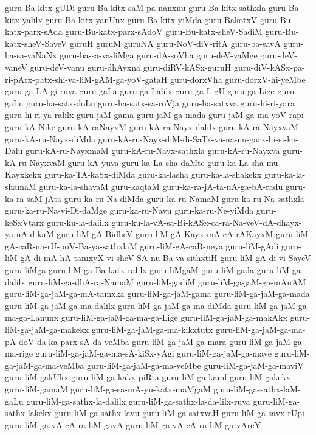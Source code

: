 {guru-Ba-kitx-gUDi
guru-Ba-kitx-saM-pa-nanxnu
guru-Ba-kitx-sathxla
guru-Ba-kitx-yalilx
guru-Ba-kitx-yanUnx
guru-Ba-kitx-yiMda
guru-BakotxV
guru-Bu-katx-parx-sAda
guru-Bu-katx-parx-sAdoV
guru-Bu-katx-sheV-SadiM
guru-Bu-katx-sheV-SaveV
guruH
guruM
guruNA
guru-NoV-diV-ritA
guru-ba-savA
guru-ba-sa-vaNaNx
guru-ba-sa-va-liMga
guru-dA-soVha
guru-deV-vaMge
guru-deV-vaneV
guru-deV-vanu
guru-dhAyxna
guru-diRV-kASx-guruH
guru-diV-kASx-pa-ri-pArx-patx-shi-va-liM-gAM-ga-yoV-gataH
guru-dorxVha
guru-dorxV-hi-yeMbe
guru-ga-LA-gi-ruva
guru-gaLa
guru-ga-Lalilx
guru-ga-LigU
guru-ga-Lige
guru-gaLu
guru-ha-satx-doLu
guru-ha-satx-sa-roVja
guru-ha-satxva
guru-hi-ri-yara
guru-hi-ri-ya-ralilx
guru-jaM-gama
guru-jaM-ga-mada
guru-jaM-ga-ma-yoV-rapi
guru-kA-Nike
guru-kA-raNayxM
guru-kA-ra-Nayx-dalilx
guru-kA-ra-NayxvaM
guru-kA-ru-Nayx-diMda
guru-kA-ru-Nayx-diM-di-SaTx-va-na-nu-garx-hi-si-ko-Dalu
guru-kA-ru-NayxmaM
guru-kA-ru-Nayx-sathxla
guru-kA-ru-Nayxva
guru-kA-ru-NayxvaM
guru-kA-yuva
guru-ka-La-sha-daMte
guru-ka-La-sha-mu-Kayxkekx
guru-ka-TA-kaSx-diMda
guru-ka-lasha
guru-ka-la-shakekx
guru-ka-la-shamaM
guru-ka-la-shavaM
guru-kaqtaM
guru-ka-ra-jA-ta-nA-ga-bA-radu
guru-ka-ra-saM-jAta
guru-ka-ru-Na-diMda
guru-ka-ru-NamaM
guru-ka-ru-Na-sathxla
guru-ka-ru-Na-vi-Di-daMge
guru-ka-ru-Navu
guru-ka-ru-Ne-yiMda
guru-keSxVtarx
guru-ku-la-dalilx
guru-ku-la-vA-sa-Bi-kASx-ca-ra-Na-veV-dA-dhayx-ya-nA-dikaM
guru-liM-gA-BidheV
guru-liM-gA-Kayx-mA-cA-rAKayxM
guru-liM-gA-caR-na-rU-poV-Ba-ya-sathxlaM
guru-liM-gA-caR-neya
guru-liM-gAdi
guru-liM-gA-di-mA-hA-tamxyX-vi-sheV-SA-nu-Ba-va-sithxtiH
guru-liM-gA-di-vi-SayeV
guru-liMga
guru-liM-ga-Ba-katx-ralilx
guru-liMgaM
guru-liM-gada
guru-liM-ga-dalilx
guru-liM-ga-dhA-ra-NamaM
guru-liM-gadiM
guru-liM-ga-jaM-ga-mAnAM
guru-liM-ga-jaM-ga-mA-tamxka
guru-liM-ga-jaM-gama
guru-liM-ga-jaM-ga-mada
guru-liM-ga-jaM-ga-ma-dalilx
guru-liM-ga-jaM-ga-ma-diMda
guru-liM-ga-jaM-ga-ma-ga-Lanunx
guru-liM-ga-jaM-ga-ma-ga-Lige
guru-liM-ga-jaM-ga-makAkx
guru-liM-ga-jaM-ga-makekx
guru-liM-ga-jaM-ga-ma-kikxtutx
guru-liM-ga-jaM-ga-ma-pA-doV-da-ka-parx-sA-da-veMba
guru-liM-ga-jaM-ga-mara
guru-liM-ga-jaM-ga-ma-rige
guru-liM-ga-jaM-ga-ma-sA-kiSx-yAgi
guru-liM-ga-jaM-ga-mave
guru-liM-ga-jaM-ga-ma-veMba
guru-liM-ga-jaM-ga-ma-veMbe
guru-liM-ga-jaM-ga-maviV
guru-liM-gakUkx
guru-liM-ga-kakx-piRta
guru-liM-ga-kamf
guru-liM-gakekx
guru-liM-gamaM
guru-liM-ga-sa-mA-yu-katx-maMgaM
guru-liM-ga-sathx-laM-gaLu
guru-liM-ga-sathx-la-dalilx
guru-liM-ga-sathx-la-da-lilx-ruva
guru-liM-ga-sathx-lakekx
guru-liM-ga-sathx-lavu
guru-liM-ga-satxvaH
guru-liM-ga-savx-rUpi
guru-liM-ga-vA-cA-ra-liM-gavA
guru-liM-ga-vA-cA-ra-liM-ga-vAreY
}
